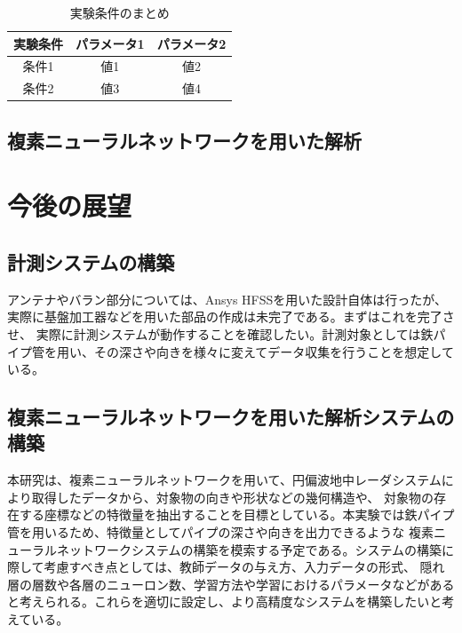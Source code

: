 \documentclass[11pt,a4paper,uplatex,draft]{ujarticle}
\begin{document}
  \begin{table}[h]
    \centering
    \caption{実験条件のまとめ}
    \begin{tabular}{|c|c|c|} %
      \hline
      実験条件 & パラメータ1 & パラメータ2 \\
      \hline
      条件1 & 値1 & 値2 \\
      条件2 & 値3 & 値4 \\
      \hline
    \end{tabular}
  \end{table}

  \subsection{複素ニューラルネットワークを用いた解析}

\section{今後の展望}

  \subsection{計測システムの構築}

    アンテナやバラン部分については、Ansys HFSSを用いた設計自体は行ったが、実際に基盤加工器などを用いた部品の作成は未完了である。まずはこれを完了させ、
    実際に計測システムが動作することを確認したい。計測対象としては鉄パイプ管を用い、その深さや向きを様々に変えてデータ収集を行うことを想定している。

  \subsection{複素ニューラルネットワークを用いた解析システムの構築}\label{CVNN_plan}

    本研究は、複素ニューラルネットワークを用いて、円偏波地中レーダシステムにより取得したデータから、対象物の向きや形状などの幾何構造や、
    対象物の存在する座標などの特徴量を抽出することを目標としている。本実験では鉄パイプ管を用いるため、特徴量としてパイプの深さや向きを出力できるような
    複素ニューラルネットワークシステムの構築を模索する予定である。システムの構築に際して考慮すべき点としては、教師データの与え方、入力データの形式、
    隠れ層の層数や各層のニューロン数、学習方法や学習におけるパラメータなどがあると考えられる。これらを適切に設定し、より高精度なシステムを構築したいと考えている。




\end{document}
